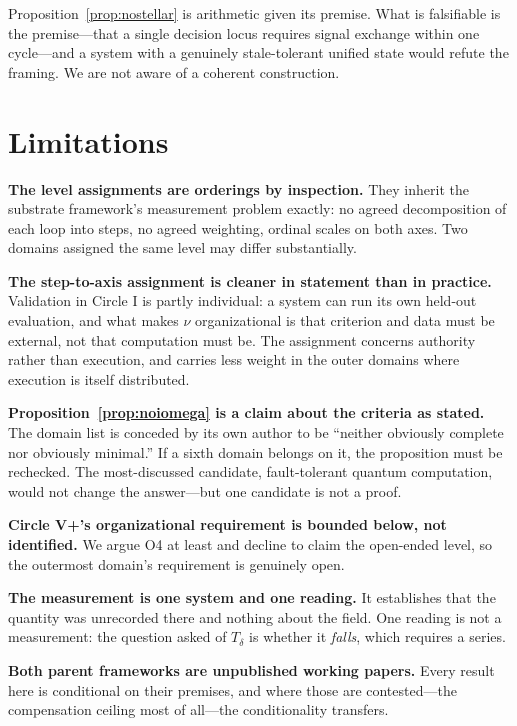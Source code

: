 \documentclass[11pt]{article}
\newcommand{\Td}{\ensuremath{T_\delta}}
\begin{document}
Proposition~\ref{prop:nostellar} is arithmetic given its premise. What is falsifiable is the premise---that a single decision locus requires signal exchange within one cycle---and a system with a genuinely stale-tolerant unified state would refute the framing. We are not aware of a coherent construction.

\section{Limitations}\label{sec:limits}

\textbf{The level assignments are orderings by inspection.} They inherit the substrate framework's measurement problem exactly: no agreed decomposition of each loop into steps, no agreed weighting, ordinal scales on both axes. Two domains assigned the same level may differ substantially.

\textbf{The step-to-axis assignment is cleaner in statement than in practice.} Validation in Circle I is partly individual: a system can run its own held-out evaluation, and what makes $\nu$ organizational is that criterion and data must be external, not that computation must be. The assignment concerns authority rather than execution, and carries less weight in the outer domains where execution is itself distributed.

\textbf{Proposition~\ref{prop:noiomega} is a claim about the criteria as stated.} The domain list is conceded by its own author to be ``neither obviously complete nor obviously minimal.'' If a sixth domain belongs on it, the proposition must be rechecked. The most-discussed candidate, fault-tolerant quantum computation, would not change the answer---but one candidate is not a proof.

\textbf{Circle V+'s organizational requirement is bounded below, not identified.} We argue O4 at least and decline to claim the open-ended level, so the outermost domain's requirement is genuinely open.

\textbf{The measurement is one system and one reading.} It establishes that the quantity was unrecorded there and nothing about the field. One reading is not a measurement: the question asked of \Td{} is whether it \emph{falls}, which requires a series.

\textbf{Both parent frameworks are unpublished working papers.} Every result here is conditional on their premises, and where those are contested---the compensation ceiling most of all---the conditionality transfers.
\end{document}
